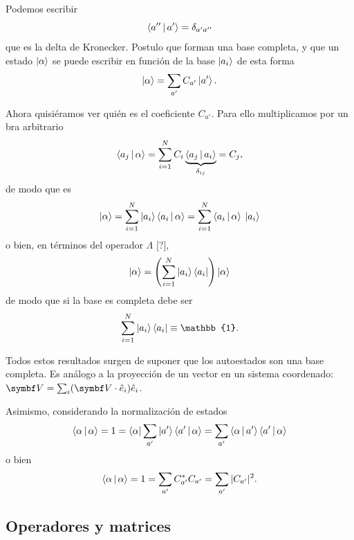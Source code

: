 \documentclass[10pt,oneside]{CBFT_book}
\begin{document}
Podemos escribir 
\[
	\Braket{a''|a'} = \delta_{a'a''}
\]
que es la delta de Kronecker.
Postulo que forman una base completa, y que un estado $\Ket{\alpha}$ se puede escribir en 
función de la base $\Ket{a_i}$ de esta forma 
\[
	\Ket{\alpha} = \sum_{a'}  C_{a'} \Ket{a'}.
\]

Ahora quisiéramos ver quién es el coeficiente $C_{a'}$.
Para ello multiplicamos por un bra arbitrario
\[
	\Braket{a_j|\alpha} = \sum_{i=1}^N C_i \underbrace{\Braket{a_j|a_i}}_{\delta_{ij}} = C_j, 
\]
de modo que es
\[
	\Ket{\alpha} = \sum_{i=1}^N \Ket{a_i}\Braket{a_i|\alpha} = 
		\sum_{i=1}^N \Braket{a_i|\alpha} \: \Ket{a_i}
\]
o bien, en términos del operador $\Lambda$ [?],
\[
	\Ket{\alpha} = \left( \sum_{i=1}^N \Ket{a_i}\Bra{a_i} \right) \Ket{\alpha} 
\]
de modo que si la base es completa debe ser
\[
	\sum_{i=1}^N \Ket{a_i}\Bra{a_i} \equiv \mathbb{1}.
\]

Todos estos resultados surgen de suponer que los autoestados son una base completa.
Es análogo a la proyección de un vector en un sistema coordenado: 
$\vb V = \sum_i (\vb V\cdot \hat{e}_i ) \hat{e}_i $.

Asimismo, considerando la normalización de estados
\[
	\Braket{\alpha|\alpha} = 1 =
	\Bra{\alpha} \sum_{a'}\Ket{a'} \Braket{a'|\alpha} = \sum_{a'} \Braket{\alpha|a'} \Braket{a'|\alpha}
\]
o bien
\[
	\Braket{\alpha|\alpha} = 1 = \sum_{a'} C_{a'}^* C_{a'} = \sum_{a'} |C_{a'}|^2.
\]


\subsection{Operadores y matrices}
\end{document}
